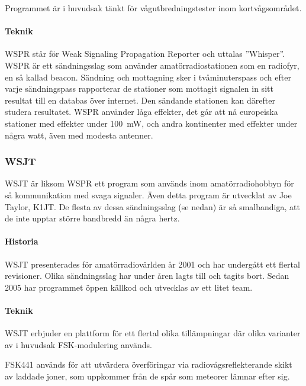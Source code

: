 Programmet är i huvudsak tänkt för vågutbredningstester inom kortvågsområdet.

\paragraph{Teknik}

WSPR står för Weak Signaling Propagation Reporter och uttalas ''Whisper''.
WSPR är ett sändningsslag som använder amatörradiostationen som en radiofyr, en
så kallad beacon.
Sändning och mottagning sker i tvåminuterspass och efter varje sändningspass
rapporterar de stationer som mottagit signalen in sitt resultat till en databas
över internet.
Den sändande stationen kan därefter studera resultatet.
WSPR använder låga effekter, det går att nå europeiska stationer med effekter
under \qty{100}{\milli\watt}, och andra kontinenter med effekter under några
watt, även med modesta antenner.

\subsubsection{WSJT}

WSJT är liksom WSPR ett program som används inom amatörradiohobbyn för så
kommunikation med svaga signaler.
Även detta program är utvecklat av Joe Taylor, K1JT.
De flesta av dessa sändningsslag (se nedan) är så smalbandiga, att de inte
upptar större bandbredd än några hertz.

\paragraph{Historia}

WSJT presenterades för amatörradiovärlden år 2001 och har undergått ett flertal
revisioner.
Olika sändningsslag har under åren lagts till och tagits bort.
Sedan 2005 har programmet öppen källkod och utvecklas av ett litet team.

\paragraph{Teknik}

WSJT erbjuder en plattform för ett flertal olika tillämpningar där olika
varianter av i huvudsak FSK-modulering används.

FSK441 används för att utvärdera överföringar via radiovågsreflekterande skikt
av laddade joner, som uppkommer från de spår som meteorer lämnar efter sig.

